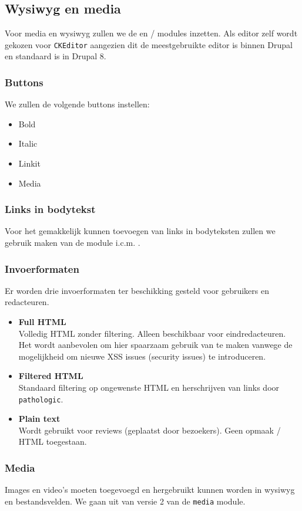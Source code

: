 \subsection{Wysiwyg en media}\label{wysiwyg}

Voor media en wysiwyg zullen we de  en  /  modules inzetten. Als editor zelf wordt gekozen voor \texttt{CKEditor} aangezien dit de meestgebruikte editor is binnen Drupal en standaard is in Drupal 8.

\subsubsection{Buttons}

We zullen de volgende buttons instellen:
\begin{itemize}
\item Bold
\item Italic
\item Linkit
\item Media
\end{itemize}

\subsubsection{Links in bodytekst}

Voor het gemakkelijk kunnen toevoegen van links in bodyteksten zullen we gebruik maken van de  module i.c.m. .

\subsubsection{Invoerformaten}\label{invoerformaten}

Er worden drie invoerformaten ter beschikking gesteld voor gebruikers en redacteuren.

\begin{itemize}
\item \textbf{Full HTML} \\
Volledig HTML zonder filtering. Alleen beschikbaar voor eindredacteuren. Het wordt aanbevolen om hier spaarzaam gebruik van te maken vanwege de mogelijkheid om nieuwe XSS issues (security issues) te introduceren.
\item \textbf{Filtered HTML} \\
Standaard filtering op ongewenste HTML en herschrijven van links door \texttt{pathologic}.
\item \textbf{Plain text} \\
Wordt gebruikt voor reviews (geplaatst door bezoekers). Geen opmaak / HTML toegestaan.
\end{itemize}

\subsubsection{Media}\label{media}

Images en video's moeten toegevoegd en hergebruikt kunnen worden in wysiwyg en bestandsvelden.
We gaan uit van versie 2 van de \texttt{media} module.


